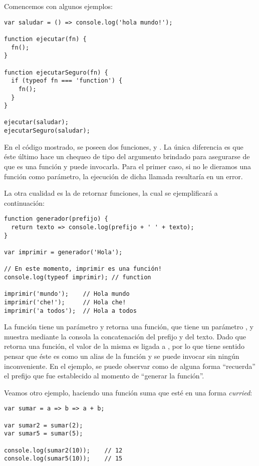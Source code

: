 Comencemos con algunos ejemplos:

\begin{lstlisting}[title={Pasando una función como argumento}]
var saludar = () => console.log('hola mundo!');

function ejecutar(fn) {
  fn();
}

function ejecutarSeguro(fn) {
  if (typeof fn === 'function') {
    fn();
  }
}

ejecutar(saludar);
ejecutarSeguro(saludar);
\end{lstlisting}

En el código mostrado, se poseen dos funciones,  y . La única diferencia es que éste último hace un chequeo de tipo del argumento brindado para asegurarse de que es una función y puede invocarla. Para el primer caso, si no le dieramos una función como parámetro, la ejecución de dicha llamada resultaría en un error.

La otra cualidad es la de retornar funciones, la cual se ejemplificará a continuación:

\begin{lstlisting}[title={Retornando funciones}]
function generador(prefijo) {
  return texto => console.log(prefijo + ' ' + texto);
}

var imprimir = generador('Hola');

// En este momento, imprimir es una función!
console.log(typeof imprimir); // function

imprimir('mundo');    // Hola mundo
imprimir('che!');     // Hola che!
imprimir('a todos');  // Hola a todos
\end{lstlisting}

La función  tiene un parámetro  y retorna una función, que tiene un parámetro , y muestra mediante la consola la concatenación del prefijo y del texto. Dado que  retorna una función, el valor de la misma es ligada a , por lo que tiene sentido pensar que éste es como un alias de la función y se puede invocar sin ningún inconveniente. En el ejemplo, se puede observar como  de alguna forma "`recuerda"' el prefijo que fue establecido al momento de "`generar la función"'.

Veamos otro ejemplo, haciendo una función suma que esté en una forma \textit{curried}:

\begin{lstlisting}[title={Función suma \textit{curried}}]
var sumar = a => b => a + b;

var sumar2 = sumar(2);
var sumar5 = sumar(5);

console.log(sumar2(10));	// 12
console.log(sumar5(10));	// 15
\end{lstlisting}

